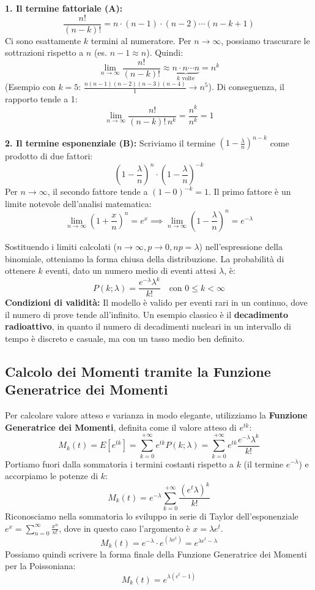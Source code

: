 \documentclass{article}
\theoremstyle{remark}
\begin{document}
\textbf{1. Il termine fattoriale (A):}
\[
\frac{n!}{(n-k)!} = n \cdot (n-1) \cdot (n-2) \cdots (n-k+1)
\]
Ci sono esattamente $k$ termini al numeratore. Per $n \to \infty$, possiamo trascurare le sottrazioni rispetto a $n$ (es. $n-1 \approx n$). Quindi:
\[
\lim_{n \to \infty} \frac{n!}{(n-k)!} \approx \underbrace{n \cdot n \cdots n}_{k \text{ volte}} = n^k
\]
(Esempio con $k=5$: $\frac{n(n-1)(n-2)(n-3)(n-4)}{1} \to n^5$).
Di conseguenza, il rapporto tende a 1:
\[
\lim_{n \to \infty} \frac{n!}{(n-k)! \, n^k} = \frac{n^k}{n^k} = 1
\]

\textbf{2. Il termine esponenziale (B):}
Scriviamo il termine $\left(1 - \frac{\lambda}{n}\right)^{n-k}$ come prodotto di due fattori:
\[
\left(1 - \frac{\lambda}{n}\right)^{n} \cdot \left(1 - \frac{\lambda}{n}\right)^{-k}
\]
Per $n \to \infty$, il secondo fattore tende a $(1-0)^{-k} = 1$.
Il primo fattore è un limite notevole dell'analisi matematica:
\[
\lim_{n \to \infty} \left(1 + \frac{x}{n}\right)^n = e^x \implies \lim_{n \to \infty} \left(1 - \frac{\lambda}{n}\right)^n = e^{-\lambda}
\]

Sostituendo i limiti calcolati ($n \to \infty, p \to 0, np=\lambda$) nell'espressione della binomiale, otteniamo la forma chiusa della distribuzione.
La probabilità di ottenere $k$ eventi, dato un numero medio di eventi attesi $\lambda$, è:
\begin{equation}
\boxed{P(k; \lambda) = \frac{e^{-\lambda} \lambda^k}{k!} \quad \text{con } 0 \le k < \infty}
\end{equation}
\textbf{Condizioni di validità:} Il modello è valido per eventi rari in un continuo, dove il numero di prove tende all'infinito.
Un esempio classico è il \textbf{decadimento radioattivo}, in quanto il numero di decadimenti nucleari in un intervallo di tempo è discreto e casuale, ma con un tasso medio ben definito.

\subsection{Calcolo dei Momenti tramite la Funzione Generatrice dei Momenti}
Per calcolare valore atteso e varianza in modo elegante, utilizziamo la \textbf{Funzione Generatrice dei Momenti}, definita come il valore atteso di $e^{tk}$:
\[
M_k(t) = E[e^{tk}] = \sum_{k=0}^{+\infty} e^{tk} P(k; \lambda) = \sum_{k=0}^{+\infty} e^{tk} \frac{e^{-\lambda} \lambda^k}{k!}
\]
Portiamo fuori dalla sommatoria i termini costanti rispetto a $k$ (il termine $e^{-\lambda}$) e accorpiamo le potenze di $k$:
\[
M_k(t) = e^{-\lambda} \sum_{k=0}^{+\infty} \frac{(e^t \lambda)^k}{k!}
\]
Riconosciamo nella sommatoria lo sviluppo in serie di Taylor dell'esponenziale $e^x = \sum_{n=0}^{\infty} \frac{x^n}{n!}$, dove in questo caso l'argomento è $x = \lambda e^t$.
\[
M_k(t) = e^{-\lambda} \cdot e^{(\lambda e^t)} = e^{\lambda e^t - \lambda}
\]
Possiamo quindi scrivere la forma finale della Funzione Generatrice dei Momenti per la Poissoniana:
\begin{equation}
\boxed{M_k(t) = e^{\lambda(e^t - 1)}}
\end{equation}
\end{document}
